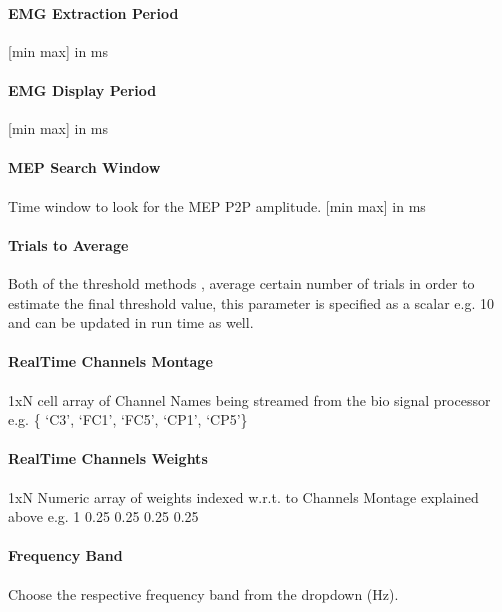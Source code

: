 \documentclass[letterpaper,10pt,english]{sphinxmanual}
\begin{document}
\paragraph{EMG Extraction Period}
\label{\detokenize{9_MEPMeasurement:emg-extraction-period}}
\sphinxAtStartPar
{[}min max{]} in ms


\paragraph{EMG Display Period}
\label{\detokenize{9_MEPMeasurement:emg-display-period}}
\sphinxAtStartPar
{[}min max{]} in ms


\paragraph{MEP Search Window}
\label{\detokenize{9_MEPMeasurement:mep-search-window}}
\sphinxAtStartPar
Time window to look for the MEP P2P amplitude. {[}min max{]} in ms


\paragraph{Trials to Average}
\label{\detokenize{9_MEPMeasurement:trials-to-average}}
\sphinxAtStartPar
Both of the threshold methods , average certain number of trials in order to estimate the final threshold value, this parameter is specified as a scalar e.g. 10 and can be updated in run time as well.


\paragraph{Real\sphinxhyphen{}Time Channels Montage}
\label{\detokenize{9_MEPMeasurement:real-time-channels-montage}}
\sphinxAtStartPar
1xN cell array of Channel Names being streamed from the bio signal processor e.g. \{ ‘C3’, ‘FC1’, ‘FC5’, ‘CP1’, ‘CP5’\}


\paragraph{Real\sphinxhyphen{}Time Channels Weights}
\label{\detokenize{9_MEPMeasurement:real-time-channels-weights}}
\sphinxAtStartPar
1xN Numeric array of weights indexed w.r.t. to Channels Montage explained above e.g. 1 \sphinxhyphen{}0.25 \sphinxhyphen{}0.25 \sphinxhyphen{}0.25 \sphinxhyphen{}0.25


\paragraph{Frequency Band}
\label{\detokenize{9_MEPMeasurement:frequency-band}}
\sphinxAtStartPar
Choose the respective frequency band from the dropdown (Hz).
\end{document}
